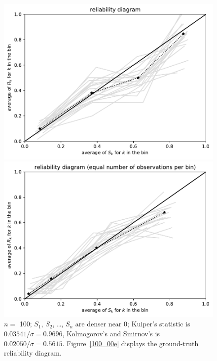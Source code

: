 \documentclass{article}
\begin{document}
\begin{figure}
\begin{centering}
\parbox{\imsize}{\includegraphics[width=\imsize]
                {./codes/unweighted/100_4_1_3/equiprob.pdf}}
\quad\quad
\parbox{\imsize}{\includegraphics[width=\imsize]
                {./codes/unweighted/100_4_1_3/equisamp.pdf}}

\end{centering}
\caption{$n =$ 100; $S_1$, $S_2$, \dots, $S_n$ are denser near 0;
         Kuiper's statistic is $0.03541 / \sigma = 0.9696$,
         Kolmogorov's and Smirnov's is $0.02050 / \sigma = 0.5615$.
Figure~\ref{100_00e} displays the ground-truth reliability diagram.
}
\label{100_00}
\end{figure}
\end{document}
